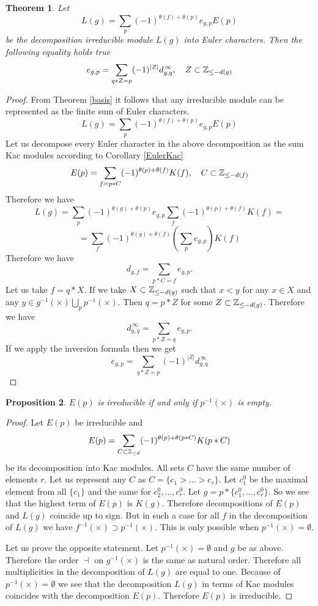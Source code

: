 \documentclass[12pt,reqno]{amsart}
\newtheorem{thm}{Theorem}[section]
\newtheorem{proposition}[thm]{Proposition}
\begin{document}
 
 

\begin{thm}\label{Euler} Let 
$$
L(g)=\sum_{p}(-1)^{\theta(f)+\theta(p)}e_{g,p}E(p)
$$
be the decomposition  irreducible module $L(g)$ into  Euler characters. Then the following equality holds true
$$
e_{g,p}=\sum_{q*Z=p}(-1)^{|Z|}d^{\,\infty}_{g,q},\quad Z\subset \Bbb Z_{\le -d(g)}
$$

\end{thm}
\begin{proof}
From Theorem \ref{basis} it follows that any irreducible module can be represented as the finite sum of Euler characters. 
$$
L(g)=\sum_{p}(-1)^{\theta(f)+\theta(p)}e_{g,p}E(p)
$$
 Let us decompose  every Euler character in the above decomposition as the sum Kac modules according to Corollary \ref{EulerKac}
$$
E(p)=\sum_{f=p*C}(-1)^{\theta(p)+\theta(f)}K(f),\quad C\subset\Bbb Z_{\le -d(f)}
$$
Therefore we have 
$$
L(g)=\sum_{p}(-1)^{\theta(g)+\theta(p)}e_{g,p}\sum_{f}(-1)^{\theta(p)+\theta(f)}K(f)=
$$
$$
=\sum_{f}(-1)^{\theta(g)+\theta(f)}\left(\sum_{p}e_{g,p}\right)K(f)
$$
Therefore  we have 
$$
d_{g,f}=\sum_{p*C=f}e_{g,p}.
$$
Let  us take $f=q*X$. If we take $X\subset \Bbb Z_{\le -d(g)}$ such that $x<y$ for any $x\in X$ and any $y\in  g^{-1}(\times)\bigcup_p p^{-1}(\times)$. Then $q=p*Z$ for some $Z\subset \Bbb Z_{\le -d(g)}$.  Therefore we have 
$$
d^{\,\infty}_{g,q}=\sum_{p*Z=q}e_{g,p}.
$$
If we apply the inversion formula then we get
$$
e_{g,p}=\sum_{q*Z=p}(-1)^{|Z|}d^{\,\infty}_{g,q}
$$
\end{proof}
\begin{proposition}\label{irreducible} $E(p)$ is irreducible  if and only if $p^{-1}(\times)$ is empty. 
\end{proposition}
\begin{proof} Let $E(p)$ be irreducible and  
$$
E(p)=\sum_{C\subset \Bbb Z_{\le d}}(-1)^{\theta(p)+\theta(p*C)}K(p*C)
$$
be its  decomposition into Kac modules. All sets $C$ have the same number  of elements  $r$. Let us  represent any $C$ as $C=\{c_1>\dots>c_r\} $. Let $c^0_1$ be the maximal element from all $\{c_1\}$ and the same for $c_2^0,\dots, c_r^0$. Let $g=p*\{c^0_1,\dots,c^0_r\}.$  So we see that the highest term of  $E(p) $ is $K(g)$. Therefore  decompositions of  $E(p)$ and $ L(g)$  coincide up to sign. But in such a case  for all $f$  in the decomposition of $L(g)$ we have $f^{-1}(\times)\supset p^{-1}(\times)$. This is only possible when $p^{-1}(\times)=\emptyset$.


Let us prove the opposite statement.  Let $p^{-1}(\times)=\emptyset$ and $g$ be as above. Therefore the order $\dashv$ on $g^{-1}(\times)$ is the same as natural order. Therefore  all multiplicities  in the decomposition of $L(g)$ are equal to one. Because of $p^{-1}(\times)=\emptyset$  we see that  the decomposition $L(g)$ in terms of Kac modules coincides  with  the decomposition $E(p)$. Therefore $E(p)$ is irreducible.
\end{proof}
\end{document}
